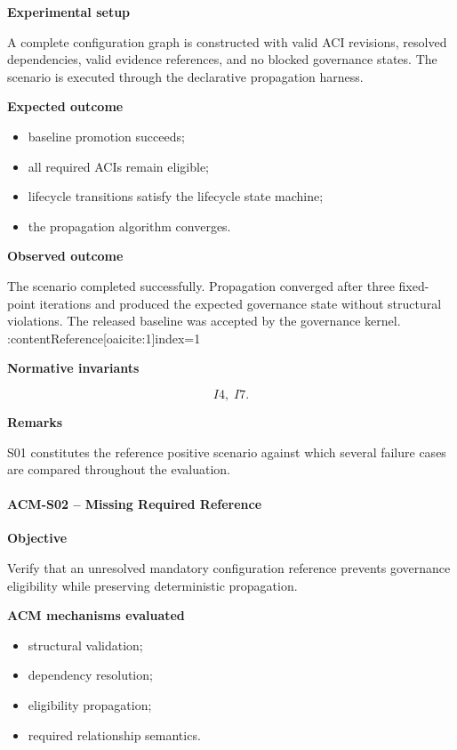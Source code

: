 \documentclass[10pt]{article}
\begin{document}
\textbf{Experimental setup}

A complete configuration graph is constructed with valid ACI revisions,
resolved dependencies, valid evidence references, and no blocked governance
states. The scenario is executed through the declarative propagation harness.

\textbf{Expected outcome}

\begin{itemize}
\item baseline promotion succeeds;
\item all required ACIs remain eligible;
\item lifecycle transitions satisfy the lifecycle state machine;
\item the propagation algorithm converges.
\end{itemize}

\textbf{Observed outcome}

The scenario completed successfully.
Propagation converged after three fixed-point iterations and produced the
expected governance state without structural violations. The released baseline
was accepted by the governance kernel. :contentReference[oaicite:1]{index=1}

\textbf{Normative invariants}

\[
I4,\;
I7.
\]

\textbf{Remarks}

S01 constitutes the reference positive scenario against which several failure
cases are compared throughout the evaluation.

\paragraph{ACM-S02 -- Missing Required Reference}

\textbf{Objective}

Verify that an unresolved mandatory configuration reference prevents governance
eligibility while preserving deterministic propagation.

\textbf{ACM mechanisms evaluated}

\begin{itemize}
\item structural validation;
\item dependency resolution;
\item eligibility propagation;
\item required relationship semantics.
\end{itemize}
\end{document}
